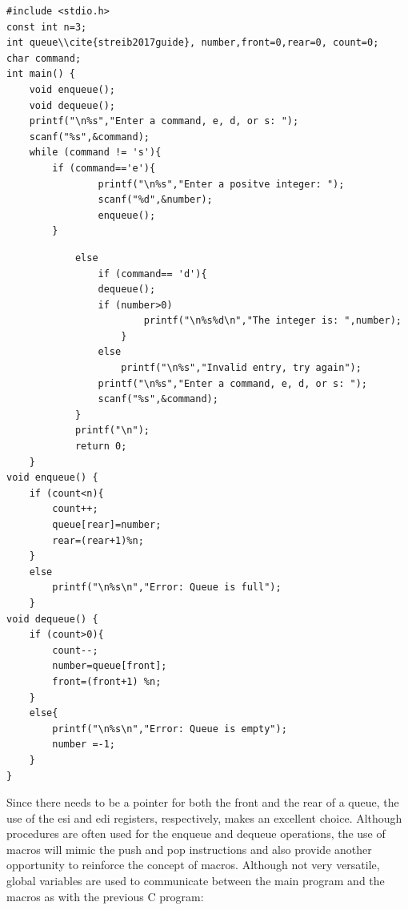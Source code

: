 \documentclass[10pt]{book}
\begin{document}
\begin{verbatim}
#include <stdio.h>
const int n=3;
int queue\\cite{streib2017guide}, number,front=0,rear=0, count=0;
char command;
int main() {
    void enqueue();
    void dequeue();
    printf("\n%s","Enter a command, e, d, or s: ");
    scanf("%s",&command);
    while (command != 's'){
        if (command=='e'){
                printf("\n%s","Enter a positve integer: ");
                scanf("%d",&number);
                enqueue();
        }
\end{verbatim}

\begin{verbatim}
            else
                if (command== 'd'){
                dequeue();
                if (number>0)
                        printf("\n%s%d\n","The integer is: ",number);
                    }
                else
                    printf("\n%s","Invalid entry, try again");
                printf("\n%s","Enter a command, e, d, or s: ");
                scanf("%s",&command);
            }
            printf("\n");
            return 0;
    }
void enqueue() {
    if (count<n){
        count++;
        queue[rear]=number;
        rear=(rear+1)%n;
    }
    else
        printf("\n%s\n","Error: Queue is full");
    }
void dequeue() {
    if (count>0){
        count--;
        number=queue[front];
        front=(front+1) %n;
    }
    else{
        printf("\n%s\n","Error: Queue is empty");
        number =-1;
    }
}
\end{verbatim}

Since there needs to be a pointer for both the front and the rear of a queue, the use of the esi and edi registers, respectively, makes an excellent choice. Although procedures are often used for the enqueue and dequeue operations, the use of macros will mimic the push and pop instructions and also provide another opportunity to reinforce the concept of macros. Although not very versatile, global variables are used to communicate between the main program and the macros as with the previous C program:
\end{document}
